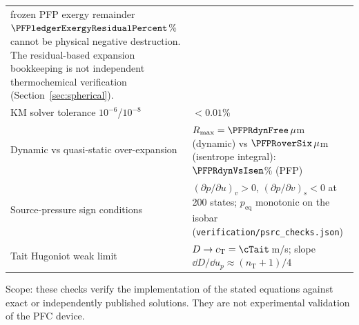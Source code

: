 \begin{center}
\begin{longtable}{>{\raggedright\arraybackslash}p{}>{\raggedright\arraybackslash}p{}}
frozen PFP exergy remainder $\PFPledgerExergyResidualPercent$\% cannot be physical negative destruction.
The residual-based expansion bookkeeping is not independent thermochemical verification (Section~\ref{sec:spherical}).\\
KM solver tolerance $10^{-6}$/$10^{-8}$ & $<0.01$\%\\
Dynamic vs quasi-static over-expansion & $R_{\max}=\PFPRdynFree\,\mu$m (dynamic) vs $\PFPRoverSix\,\mu$m (isentrope integral):
$\PFPRdynVsIsen$\% (PFP)\\
Source-pressure sign conditions & $(\partial p/\partial u)_v>0$, $(\partial p/\partial v)_s<0$ at 200 states; $p_{\mathrm{eq}}$ monotonic
on the isobar (\texttt{verification/psrc\_checks.json})\\
Tait Hugoniot weak limit & $D\to c_{\mathrm T}=\cTait$\,m/s; slope $\dd D/\dd u_p\approx(n_{\mathrm T}+1)/4$\\
\bottomrule
\end{longtable}
\end{center}
Scope: these checks verify the implementation of the stated equations against exact or independently
published solutions. They are not experimental validation of the PFC device.

